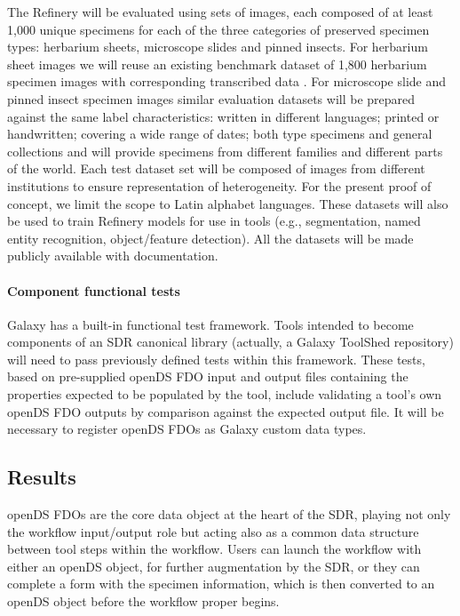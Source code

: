 The Refinery will be evaluated using sets of images, each composed of at
least 1,000 unique specimens for each of the three categories of
preserved specimen types: herbarium sheets, microscope slides and pinned
insects. For herbarium sheet images we will reuse an existing benchmark
dataset of 1,800 herbarium specimen images with corresponding
transcribed data \cite{Dillen 2019b}. For microscope slide and pinned insect
specimen images similar evaluation datasets will be prepared against the
same label characteristics: written in different languages; printed or
handwritten; covering a wide range of dates; both type specimens and
general collections and will provide specimens from different families
and different parts of the world. Each test dataset set will be composed
of images from different institutions to ensure representation of
heterogeneity. For the present proof of concept, we limit the scope to
Latin alphabet languages. These datasets will also be used to train
Refinery models for use in tools (e.g., segmentation, named entity
recognition, object/feature detection). All the datasets will be made
publicly available with documentation.

\paragraph{Component functional tests}\label{component-functional-tests}

Galaxy has a built-in functional test framework. Tools intended to
become components of an SDR canonical library (actually, a Galaxy
ToolShed repository) will need to pass previously defined tests within
this framework. These tests, based on pre-supplied openDS FDO input and
output files containing the properties expected to be populated by the
tool, include validating a tool's own openDS FDO outputs by comparison
against the expected output file. It will be necessary to register
openDS FDOs as Galaxy custom data types.

\subsection{Results}\label{results}

openDS FDOs are the core data object at the heart of the \acrshort{SDR}, playing
not only the workflow input/output role but acting also as a common data
structure between tool steps within the workflow. Users can launch the
workflow with either an openDS object, for further augmentation by the
SDR, or they can complete a form with the specimen information, which is
then converted to an openDS object before the workflow proper begins.


